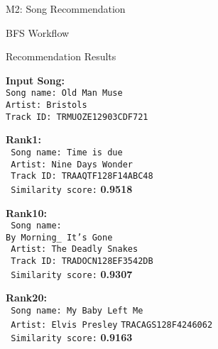 \documentclass{beamer}
\begin{document}
\begin{section}{M2: Song Recommendation}
\begin{frame}[fragile]{BFS Workflow}
\begin{figure}
    \end{figure}
    \end{frame}

    \begin{frame}{Recommendation Results}
        
        \begin{minipage}[b]{0.5\linewidth}
        \textbf{Input Song:}\\
        \texttt{Song name: Old Man Muse} \\
        \texttt{Artist: Bristols} \\
        \texttt{Track ID: TRMUOZE12903CDF721}
        \end{minipage}%
        \begin{minipage}[b]{0.5\linewidth}
        \textbf{Rank1: } \\
        \texttt{     Song name: Time is due} \\
        \texttt{     Artist: Nine Days Wonder} \\
        \texttt{     Track ID: TRAAQTF128F14ABC48} \\
        \texttt{     Similarity score:} \textbf{0.9518}
        \end{minipage}
        
        \vspace{1.0cm} 
        
        \begin{minipage}[b]{0.5\linewidth}
        \textbf{Rank10: }\\
        \texttt{  Song name: \\ By Morning\_ It's Gone} \\
        \texttt{  Artist: The Deadly Snakes} \\
        \texttt{  Track ID: TRADOCN128EF3542DB} \\
        \texttt{  Similarity score:} \textbf{0.9307}
        \end{minipage}%
        \begin{minipage}[b]{0.5\linewidth}
        \textbf{Rank20: } \\
        \texttt{  Song name: My Baby Left Me} \\
        \texttt{  Artist: Elvis Presley}  \texttt{TRACAGS128F4246062} \\
        \texttt{  Similarity score:} \textbf{0.9163}
        \end{minipage}


\end{frame}
\end{section}
\end{document}

